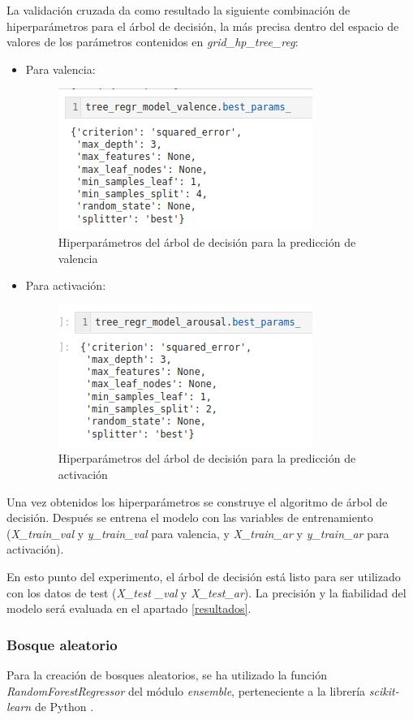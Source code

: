 \documentclass[12pt,a4paper,Spanish]{article}
\begin{document}
La validación cruzada da como resultado la siguiente combinación de hiperparámetros para el árbol de decisión, la más precisa dentro del espacio de valores de los parámetros contenidos en \textit{grid\_hp\_tree\_reg}:
\begin{itemize}
	\item Para valencia:
	\begin{figure}[H]
		\centering
		\includegraphics[width=0.5\linewidth]{figs/final_params_tree}
		\caption{Hiperparámetros del árbol de decisión para la predicción de valencia}
		\label{fig:finalparamstree}
	\end{figure}
	\item Para activación:
	\begin{figure}[H]
		\centering
		\includegraphics[width=0.5\linewidth]{figs/final_params_tree_arousal}
		\caption{Hiperparámetros del árbol de decisión para la predicción de activación}
		\label{fig:finalparamstreearousal}
	\end{figure}
\end{itemize}

Una vez obtenidos los hiperparámetros se construye el algoritmo de árbol de decisión. Después se entrena el modelo con las variables de entrenamiento (\textit{X\_train\_val} y \textit{y\_train\_val} para valencia, y \textit{X\_train\_ar} y \textit{y\_train\_ar} para activación).
\newline

En esto punto del experimento, el árbol de decisión está listo para ser utilizado con los datos de test (\textit{X\_test \_val} y \textit{X\_test\_ar}). La precisión y la fiabilidad del modelo será evaluada en el apartado \ref{resultados}.

\subsubsection{Bosque aleatorio}
Para la creación de bosques aleatorios, se ha utilizado la función \textit{RandomForestRegressor} del módulo \textit{ensemble}, perteneciente a la librería \textit{scikit-learn} de Python \cite{scikit-learn}.
\newline
\end{document}
